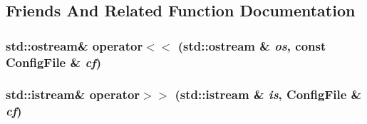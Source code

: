 \subsection{Friends And Related Function Documentation}
\hypertarget{classConfigFile_a8ccacbc37db1992a5515e2c72fc83ce6}{
\subsubsection[{operator$<$$<$}]{\setlength{\rightskip}{0pt plus 5cm}std::ostream\& operator$<$$<$ (std::ostream \& {\em os}, \/  const {\bf ConfigFile} \& {\em cf})}}
\label{classConfigFile_a8ccacbc37db1992a5515e2c72fc83ce6}
\hypertarget{classConfigFile_a25042475439039e70f90febe7d0e63ec}{
\subsubsection[{operator$>$$>$}]{\setlength{\rightskip}{0pt plus 5cm}std::istream\& operator$>$$>$ (std::istream \& {\em is}, \/  {\bf ConfigFile} \& {\em cf})}}
\label{classConfigFile_a25042475439039e70f90febe7d0e63ec}



